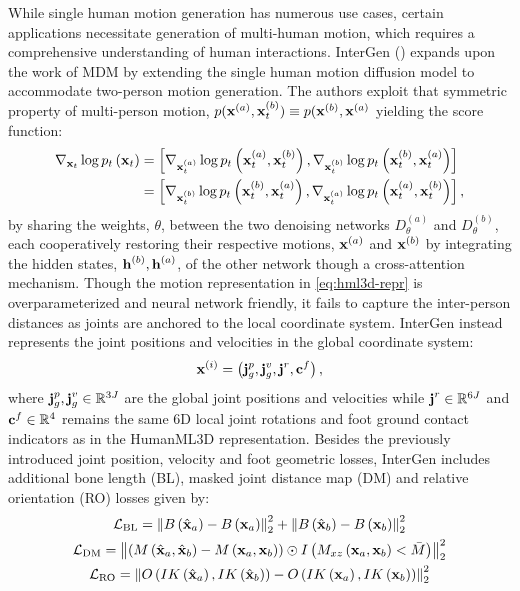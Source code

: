 While single human motion generation has numerous use cases, certain applications necessitate generation of multi-human motion, which requires a comprehensive understanding of human interactions. InterGen (\cite{liang2024intergen}) expands upon the work of MDM by extending the single human motion diffusion model to accommodate two-person motion generation. The authors exploit that symmetric property of multi-person motion, $p(\boldsymbol{\mathbf{x}}^{(a)}, \boldsymbol{\mathbf{x}}_t^{(b)}) \equiv p(\boldsymbol{\mathbf{x}}^{(b)}, \boldsymbol{\mathbf{x}}^{(a)}$ yielding the score function:
\begin{align}
    \nabla_{\boldsymbol{\mathbf{x}}_t} \log p_t\left(\boldsymbol{\mathbf{x}}_t\right) &= \left[
        \nabla_{\boldsymbol{\mathbf{x}}_t^{(a)}} \log p_t\left(\boldsymbol{\mathbf{x}}_t^{(a)}, \boldsymbol{\mathbf{x}}_t^{(b)}\right), 
        \nabla_{\boldsymbol{\mathbf{x}}_t^{(b)}} \log p_t\left(\boldsymbol{\mathbf{x}}_t^{(b)}, \boldsymbol{\mathbf{x}}_t^{(a)}\right)
    \right] \\
    & = \left[
        \nabla_{\boldsymbol{\mathbf{x}}_t^{(b)}} \log p_t\left(\boldsymbol{\mathbf{x}}_t^{(b)}, \boldsymbol{\mathbf{x}}_t^{(a)}\right),
        \nabla_{\boldsymbol{\mathbf{x}}_t^{(a)}} \log p_t\left(\boldsymbol{\mathbf{x}}_t^{(a)}, \boldsymbol{\mathbf{x}}_t^{(b)}\right) 
    \right],
\end{align}
by sharing the weights, $\theta$, between the two denoising networks $D_\theta^{(a)}$ and $D_\theta^{(b)}$, each cooperatively restoring their respective motions, $\boldsymbol{\mathbf{x}}^{(a)}$ and $\boldsymbol{\mathbf{x}}^{(b)}$ by integrating the hidden states, $\boldsymbol{\mathbf{h}}^{(b)}, \boldsymbol{\mathbf{h}}^{(a)}$, of the other network though a cross-attention mechanism. Though the motion representation in \cref{eq:hml3d-repr} is overparameterized and neural network friendly, it fails to capture the inter-person distances as joints are anchored to the local coordinate system. InterGen instead represents the joint positions and velocities in the global coordinate system:
\begin{equation}
    \boldsymbol{\mathbf{x}}^{(i)} = \left( \boldsymbol{\mathbf{j}}_g^p, \boldsymbol{\mathbf{j}}_g^v, \boldsymbol{\mathbf{j}}^r, \boldsymbol{\mathbf{c}}^f \right),
\end{equation}
where $\boldsymbol{\mathbf{j}}_g^p, \boldsymbol{\mathbf{j}}_g^v \in \mathbb{R}^{3J}$ are the global joint positions and velocities while $\boldsymbol{\mathbf{j}}^r \in \mathbb{R}^{6J}$ and $\boldsymbol{\mathbf{c}}^f \in \mathbb{R}^4$ remains the same 6D local joint rotations and foot ground contact indicators as in the HumanML3D representation. Besides the previously introduced joint position, velocity and foot geometric losses, InterGen includes additional bone length (BL), masked joint distance map (DM) and relative orientation (RO) losses given by:
\begin{gather}
    \mathcal{L}_\text{BL}=\left\|B\left(\hat{\boldsymbol{\mathbf{x}}}_a\right)-B\left(\boldsymbol{\mathbf{x}}_a\right)\right\|_2^2+\left\|B\left(\hat{\boldsymbol{\mathbf{x}}}_b\right)-B\left(\boldsymbol{\mathbf{x}}_b\right)\right\|_2^2  \\
    \mathcal{L}_\text{DM} = \left\|\left(M\left(\hat{\mathbf{x}}_a, \hat{\mathbf{x}}_b\right)-M\left(\mathbf{x}_a, \mathbf{x}_b\right)\right) \odot I\left(M_{x z}\left(\mathbf{x}_a, \mathbf{x}_b\right)<\bar{M}\right)\right\|_2^2 \\
    \mathcal{L}_\text{RO} = \left\|O\left(I K\left(\hat{\mathbf{x}}_a\right), I K\left(\hat{\mathbf{x}}_b\right)\right)-O\left(I K\left(\mathbf{x}_a\right), I K\left(\mathbf{x}_b\right)\right)\right\|_2^2
\end{gather}

